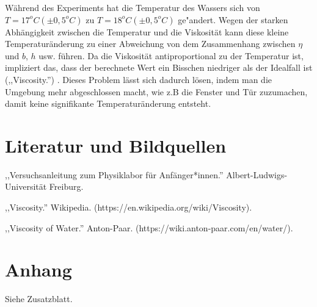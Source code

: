 \documentclass[11pt,a4paper]{article}
\begin{document}
Während des Experiments hat die Temperatur des Wassers sich von $T=17^{o}C  (\pm 0,5 ^{o}C)$ zu $T=18^{o}C (\pm 0,5 ^{o}C)$ ge"andert. Wegen der starken Abhängigkeit zwischen die Temperatur und 
die Viskosität kann diese kleine Temperaturänderung zu einer Abweichung von dem Zusammenhang zwischen $\eta$ und $b$, $h$ usw. führen. Da die Viskosität  antiproportional zu der Temperatur ist, impliziert das, dass der berechnete Wert ein Bisschen niedriger als der Idealfall ist (,,Viscosity.'') . Dieses Problem lässt sich dadurch lösen, indem man die Umgebung mehr abgeschlossen macht, wie z.B die Fenster und Tür zuzumachen, damit keine signifikante Temperaturänderung entsteht. 


\section{Literatur und Bildquellen}

,,Versuchsanleitung zum Physiklabor für Anfänger*innen.'' Albert-Ludwigs-Universität Freiburg. 

,,Viscosity.'' Wikipedia. (https://en.wikipedia.org/wiki/Viscosity). 

,,Viscosity of Water.'' Anton-Paar. (https://wiki.anton-paar.com/en/water/).

\section{Anhang}
Siehe Zusatzblatt. 
	
	
	
	
	
	
	
	
	
	
\end{document}
